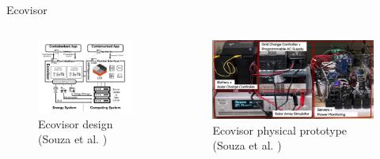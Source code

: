\begin{frame}{Ecovisor}
    \begin{columns}
        \begin{figure}
            \centering
            \includegraphics[width=\textwidth]{../../ecovisor_design}
            \caption{Ecovisor design (Souza et al. \cite{souza2022})}
            \label{fig:ecovisor_design}
        \end{figure}
        \begin{figure}
            \centering
            \includegraphics[width=\textwidth]{../../ecovisor_testbed}
            \caption{Ecovisor physical prototype (Souza et al. \cite{souza2022})}
            \label{fig:ecovisor_testbed}
        \end{figure}
    \end{columns}
\end{frame}

